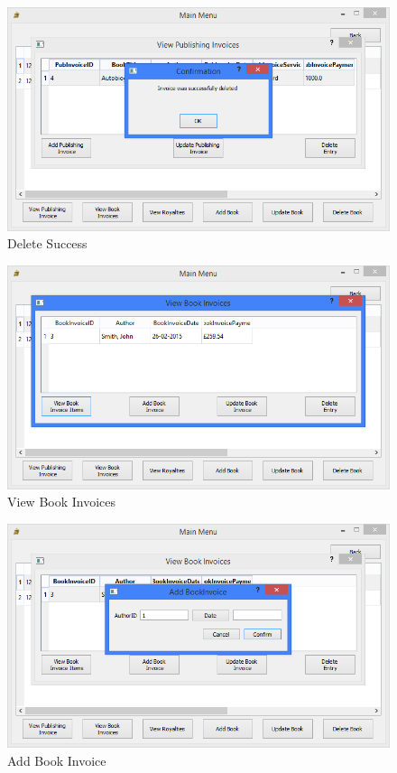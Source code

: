 \begin{figure}[H]
    \caption{Delete Success} \label{fig:DeletePubInvoiceSuccess}
    \includegraphics[width=\textwidth]{./Maintenance/UserInterface/DeletePubInvoiceSuccess.png}
\end{figure}

\begin{figure}[H]
    \caption{View Book Invoices} \label{fig:ViewBookInvoices}
    \includegraphics[width=\textwidth]{./Maintenance/UserInterface/ViewBookInvoices.png}
\end{figure}

\begin{figure}[H]
    \caption{Add Book Invoice} \label{fig:AddBookInvoice}
    \includegraphics[width=\textwidth]{./Maintenance/UserInterface/AddBookInvoice.png}
\end{figure}


